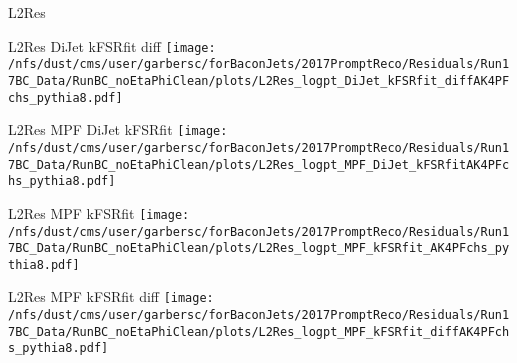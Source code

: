 \documentclass[t,compress]{beamer}
\begin{document}
\begin{frame}{L2Res}
\begin{minipage}{0.24\textwidth}
\tiny  L2Res   DiJet kFSRfit diff   
 \newline
	\texttt{[image: /nfs/dust/cms/user/garbersc/forBaconJets/2017PromptReco/Residuals/Run17BC\_Data/RunBC\_noEtaPhiClean/plots/L2Res\_logpt\_DiJet\_kFSRfit\_diffAK4PFchs\_pythia8.pdf]}
\end{minipage}
\begin{minipage}{0.24\textwidth}
\tiny  L2Res   MPF DiJet kFSRfit   
 \newline
	\texttt{[image: /nfs/dust/cms/user/garbersc/forBaconJets/2017PromptReco/Residuals/Run17BC\_Data/RunBC\_noEtaPhiClean/plots/L2Res\_logpt\_MPF\_DiJet\_kFSRfitAK4PFchs\_pythia8.pdf]}
\end{minipage}
\begin{minipage}{0.24\textwidth}
\tiny  L2Res   MPF kFSRfit    
 \newline
	\texttt{[image: /nfs/dust/cms/user/garbersc/forBaconJets/2017PromptReco/Residuals/Run17BC\_Data/RunBC\_noEtaPhiClean/plots/L2Res\_logpt\_MPF\_kFSRfit\_AK4PFchs\_pythia8.pdf]}
\end{minipage}
\begin{minipage}{0.24\textwidth}
\tiny  L2Res   MPF kFSRfit diff   
 \newline
	\texttt{[image: /nfs/dust/cms/user/garbersc/forBaconJets/2017PromptReco/Residuals/Run17BC\_Data/RunBC\_noEtaPhiClean/plots/L2Res\_logpt\_MPF\_kFSRfit\_diffAK4PFchs\_pythia8.pdf]}
\end{minipage}
\end{frame}
\end{document}
